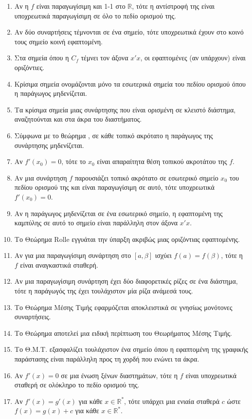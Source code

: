 \begin{enumerate}[label=\textbf{2.\arabic*.}]
    \item Αν η $f$ είναι παραγωγίσιμη και 1-1 στο $\mathbb{R}$, τότε η αντίστροφή της είναι υποχρεωτικά παραγωγίσιμη σε όλο το πεδίο ορισμού της.
    \item Αν δύο συναρτήσεις τέμνονται σε ένα σημείο, τότε υποχρεωτικά έχουν στο κοινό τους σημείο κοινή εφαπτομένη.
    \item Στα σημεία όπου η $C_f$ τέμνει τον άξονα $x'x$, οι εφαπτομένες (αν υπάρχουν) είναι οριζόντιες.
    \item Κρίσιμα σημεία ονομάζονται μόνο τα εσωτερικά σημεία του πεδίου ορισμού όπου η παράγωγος μηδενίζεται.
    \item Τα κρίσιμα σημεία μιας συνάρτησης που είναι ορισμένη σε κλειστό διάστημα, αναζητούνται και στα άκρα του διαστήματος.
    \item Σύμφωνα με το θεώρημα , σε κάθε τοπικό ακρότατο η παράγωγος της συνάρτησης μηδενίζεται.
    \item Αν $f'(x_0) = 0$, τότε το $x_0$ είναι απαραίτητα θέση τοπικού ακροτάτου της $f$.
    \item Αν μια συνάρτηση $f$ παρουσιάζει τοπικό ακρότατο σε εσωτερικό σημείο $x_0$ του πεδίου ορισμού της και είναι παραγωγίσιμη σε αυτό, τότε υποχρεωτικά $f'(x_0) = 0$.
    \item Αν η παράγωγος μηδενίζεται σε ένα εσωτερικό σημείο, η εφαπτομένη της καμπύλης σε αυτό το σημείο είναι παράλληλη στον άξονα $x'x$.
    \item Το Θεώρημα Rolle εγγυάται την ύπαρξη ακριβώς μιας οριζόντιας εφαπτομένης.
    \item Αν για μια παραγωγίσιμη συνάρτηση στο $[a,\beta]$ ισχύει $f(a) = f(\beta)$, τότε η $f$ είναι αναγκαστικά σταθερή.
    \item Αν μια παραγωγίσιμη συνάρτηση έχει δύο διαφορετικές ρίζες σε ένα διάστημα, τότε η παράγωγός της έχει τουλάχιστον μία ρίζα ανάμεσά τους.
    \item Το Θεώρημα Μέσης Τιμής εφαρμόζεται αποκλειστικά σε γνησίως μονότονες συναρτήσεις.
    \item Το Θεώρημα  αποτελεί μια ειδική περίπτωση του Θεωρήματος Μέσης Τιμής.
    \item Το Θ.Μ.Τ. εξασφαλίζει τουλάχιστον ένα σημείο όπου η εφαπτομένη της γραφικής παράστασης είναι παράλληλη προς τη χορδή που ενώνει τα άκρα.
    \item Αν $f'(x) = 0$ σε μια ένωση ξένων διαστημάτων, τότε η $f$ είναι υποχρεωτικά σταθερή σε ολόκληρο το πεδίο ορισμού της.
    \item Αν $f'(x) = g'(x)$ για κάθε $x \in \mathbb{R}^*$, τότε υπάρχει μια ενιαία σταθερά $c$ ώστε $f(x) = g(x) + c$ για κάθε $x \in \mathbb{R}^*$.

\end{enumerate}
